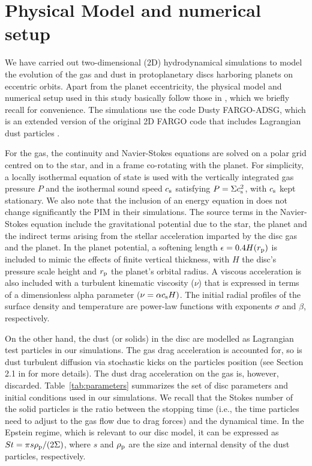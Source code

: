 \documentclass[fleqn,usenatbib]{mnras}
\begin{document}
\section{Physical Model and numerical setup}
\label{sec:model}
We have carried out two-dimensional (2D) hydrodynamical simulations to model the evolution of the gas and dust in protoplanetary discs harboring planets on eccentric orbits. Apart from the planet eccentricity, the physical model and numerical setup used in this study basically follow those in \citet{Ataiee_etal2018}, which we briefly recall for convenience. The simulations use the code Dusty FARGO-ADSG, which is an extended version of the original 2D FARGO code \citep[][]{Masset2000} that includes Lagrangian dust particles \citep{BZ2016}.

For the gas, the continuity and Navier-Stokes equations are solved on a polar grid centred on to the star, and in a frame co-rotating with the planet. For simplicity, a locally isothermal equation of state is used with the vertically integrated gas pressure $P$ and the isothermal sound speed $c_{\rm s}$ satisfying $P=\Sigma c_{\rm s}^2$, with $c_{\rm s}$ kept stationary. We also note that the inclusion of an energy equation in \citet{Bitsch_etal2018} does not change significantly the PIM in their simulations. The source terms in the Navier-Stokes equation include the gravitational potential due to the star, the planet and the indirect terms arising from the stellar acceleration imparted by the disc gas and the planet. In the planet potential, a softening length $\epsilon=0.4H(r_{\rm p})$ is included to mimic the effects of finite vertical thickness, with $H$ the disc's pressure scale height and $r_{\rm p}$ the planet's orbital radius. A viscous acceleration is also included with a turbulent kinematic viscosity ($\nu$) that is expressed in terms of a dimensionless alpha parameter ($\nu = \alpha c_{\rm s}H)$. The initial radial profiles of the surface density and temperature are power-law functions with exponents $\sigma$ and $\beta$, respectively. 

On the other hand, the dust (or solids) in the disc are modelled as Lagrangian test particles in our simulations. The gas drag acceleration is accounted for, so is dust turbulent diffusion via stochastic kicks on the particles position (see Section 2.1 in \citealp{Ataiee_etal2018} for more details). The dust drag acceleration on the gas is, however, discarded. Table~\ref{tab:parameters} summarizes the set of disc parameters and initial conditions used in our simulations. We recall that the Stokes number of the solid particles is the ratio between the stopping time (i.e., the time particles need to adjust to the gas flow due to drag forces) and the dynamical time. In the Epstein regime, which is relevant to our disc model, it can be expressed as $St=\pi s\rho_{\rm p}/(2 \Sigma)$, where $s$ and $\rho_{\rm p}$ are the size and internal density of the dust particles, respectively.
\end{document}
